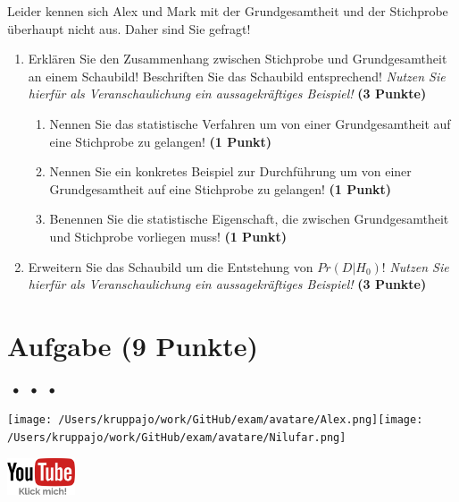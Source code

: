 \documentclass[a4paper, 9pt]{scrartcl}\usepackage[]{graphicx}\usepackage[]{xcolor}
\begin{document}
\vspace{1ex}

Leider kennen sich Alex und Mark mit der Grundgesamtheit und der Stichprobe überhaupt nicht aus. Daher sind Sie gefragt!

\begin{enumerate}
\item Erklären Sie den Zusammenhang zwischen Stichprobe und Grundgesamtheit an einem Schaubild! Beschriften Sie das Schaubild entsprechend! \textit{Nutzen Sie hierfür als Veranschaulichung ein aussagekräftiges Beispiel!}  \textbf{(3 Punkte)}
\begin{enumerate}
\item Nennen Sie das statistische Verfahren um von einer Grundgesamtheit auf eine Stichprobe zu gelangen!  \textbf{(1 Punkt)}
\item Nennen Sie ein konkretes Beispiel zur Durchführung um von einer Grundgesamtheit auf eine Stichprobe zu gelangen! \textbf{(1 Punkt)}
\item Benennen Sie die statistische Eigenschaft, die zwischen Grundgesamtheit und Stichprobe vorliegen muss! \textbf{(1 Punkt)}
\end{enumerate}
\item Erweitern Sie das Schaubild um die Entstehung von $Pr(D|H_0)$! \textit{Nutzen Sie hierfür als Veranschaulichung ein aussagekräftiges Beispiel!}  \textbf{(3 Punkte)}
\end{enumerate}

 
\clearpage

\section{Aufgabe \hfill (9 Punkte)}


 
\ifcollection
\begin{flushright}
\tiny
\textbf{\examinhaltstart}
\exammodulestat $\;\bullet$
\exammodulestatbbv $\;\bullet$
\exammodulestatversuch $\;\bullet$
\exammodulebiostat
\vspace{-4Ex}
\end{flushright}
\begin{minipage}[t]{0.5\textwidth}
\texttt{[image: /Users/kruppajo/work/GitHub/exam/avatare/Alex.png]}\hspace{-4mm}\texttt{[image: /Users/kruppajo/work/GitHub/exam/avatare/Nilufar.png]}
\end{minipage}
\begin{minipage}[t]{0.5\textwidth}
\hfill
\href{https://youtu.be/XAE8BwNmCQ0}{\includegraphics[width = 2cm]{img/youtube}}
\end{minipage}
\fi
\end{document}
